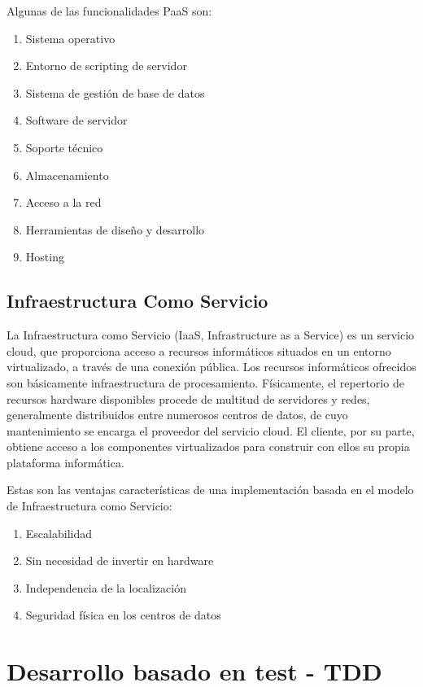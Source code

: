 \documentclass[a4paper,11pt]{book}
\begin{document}
Algunas de las funcionalidades PaaS son:

\begin{enumerate}
\item Sistema operativo 
\item Entorno de scripting de servidor 
\item Sistema de gestión de base de datos 
\item Software de servidor 
\item Soporte técnico 
\item Almacenamiento 
\item Acceso a la red 
\item Herramientas de diseño y desarrollo 
\item Hosting 
\end{enumerate}


\subsection{Infraestructura Como Servicio}
La Infraestructura como Servicio\cite{iaas} (IaaS, Infrastructure as a Service) es un servicio cloud, que proporciona acceso a recursos informáticos situados en un entorno virtualizado, a través de una conexión pública. Los recursos informáticos ofrecidos  son básicamente infraestructura de procesamiento. Físicamente, el repertorio de recursos hardware disponibles procede de multitud de servidores y redes, generalmente distribuidos entre numerosos centros de datos, de cuyo mantenimiento se encarga el proveedor del servicio cloud. El cliente, por su parte, obtiene acceso a los componentes virtualizados para construir con ellos su propia plataforma informática.

Estas son las ventajas características de una implementación basada en el modelo de Infraestructura como Servicio:

\begin{enumerate}
\item Escalabilidad
\item Sin necesidad de invertir en hardware
\item Independencia de la localización
\item Seguridad física en los centros de datos
\end{enumerate}


\section{Desarrollo basado en test - TDD}
\end{document}

